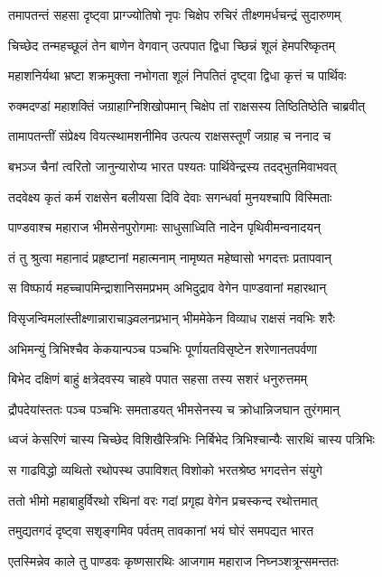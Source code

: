 \twolineshloka
{तमापतन्तं सहसा दृष्ट्वा प्राग्ज्योतिषो नृपः}
{चिक्षेप रुचिरं तीक्ष्णमर्धचन्द्रं सुदारुणम्}


\twolineshloka
{चिच्छेद तन्महच्छूलं तेन बाणेन वेगवान्}
{उत्पपात द्विधा च्छिन्नं शूलं हेमपरिष्कृतम्}


\twolineshloka
{महाशनिर्यथा भ्रष्टा शक्रमुक्ता नभोगता}
{शूलं निपतितं दृष्ट्वा द्विधा कृत्तं च पार्थिवः}


\twolineshloka
{रुक्मदण्डां महाशक्तिं जग्राहाग्निशिखोपमान्}
{चिक्षेप तां राक्षसस्य तिष्ठितिष्ठेति चाब्रवीत्}


\twolineshloka
{तामापतन्तीं संप्रेक्ष्य वियत्स्थामशनीमिव}
{उत्पत्य राक्षसस्तूर्णं जग्राह च ननाद च}


\twolineshloka
{बभञ्ज चैनां त्वरितो जानुन्यारोप्य भारत}
{पश्यतः पार्थिवेन्द्रस्य तदद्भुतमिवाभवत्}


\twolineshloka
{तदवेक्ष्य कृतं कर्म राक्षसेन बलीयसा}
{दिवि देवाः सगन्धर्वा मुनयश्चापि विस्मिताः}


\twolineshloka
{पाण्डवाश्च महाराज भीमसेनपुरोगमाः}
{साधुसाध्विति नादेन पृथिवीमन्वनादयन्}


\twolineshloka
{तं तु श्रुत्वा महानादं प्रहृष्टानां महात्मनाम्}
{नामृष्यत महेष्वासो भगदत्तः प्रतापवान्}


\twolineshloka
{स विष्फार्य महच्चापमिन्द्राशानिसमप्रभम्}
{अभिदुद्राव वेगेन पाण्डवानां महारथान्}


\twolineshloka
{विसृजन्विमलांस्तीक्ष्णान्नाराचाञ्ज्वलनप्रभान्}
{भीममेकेन विव्याध राक्षसं नवभिः शरैः}


\twolineshloka
{अभिमन्युं त्रिभिश्चैव केकयान्पञ्च पञ्चभिः}
{पूर्णायतविसृष्टेन शरेणानतपर्वणा}


\twolineshloka
{बिभेद दक्षिणं बाहुं क्षत्रेदवस्य चाहवे}
{पपात सहसा तस्य सशरं धनुरुत्तमम्}


\twolineshloka
{द्रौपदेयांस्ततः पञ्च पञ्चभिः समताडयत्}
{भीमसेनस्य च क्रोधान्निजघान तुरंगमान्}


\twolineshloka
{ध्वजं केसरिणं चास्य चिच्छेद विशिखैस्त्रिभिः}
{निर्बिभेद त्रिभिश्चान्यैः सारथिं चास्य पत्रिभिः}


\twolineshloka
{स गाढविद्धो व्यथितो रथोपस्थ उपाविशत्}
{विशोको भरतश्रेष्ठ भगदत्तेन संयुगे}


\twolineshloka
{ततो भीमो महाबाहुर्विरथो रथिनां वरः}
{गदां प्रगृह्य वेगेन प्रचस्कन्द रथोत्तमात्}


\twolineshloka
{तमुद्यतगदं दृष्ट्वा सशृङ्गमिव पर्वतम्}
{तावकानां भयं घोरं समपद्यत भारत}


\twolineshloka
{एतस्मिन्नेव काले तु पाण्डवः कृष्णसारथिः}
{आजगाम महाराज निघ्नञ्शत्रून्समन्ततः}


